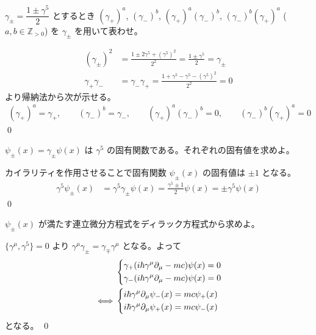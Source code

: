 \documentclass[uplatex,dvipdfmx,a4paper,11pt]{jlreq}
\makeatletter
\newcommand{\ZZ}{\mathbb{Z}}
\numberwithin{equation}{section}
\theoremstyle{definition}
\renewenvironment{proof}[1][\proofname]{\par
  \normalfont
  \topsep6\p@\@plus6\p@ \trivlist
  \item[\hskip\labelsep{\bfseries #1}\@addpunct{\bfseries}]\ignorespaces\quad\par
}{%
  \qed\endtrivlist\@endpefalse
}
\renewcommand\proofname{証明}
\makeatother
\begin{document}
\begin{problem}
$\gamma_\pm = \dfrac{1 \pm \gamma^5}{2}$ とするとき $(\gamma_+)^a$, $(\gamma_-)^b$, $(\gamma_+)^a(\gamma_-)^b$, $(\gamma_-)^b(\gamma_+)^a$ ($a, b\in\ZZ_{>0}$) を $\gamma_\pm$ を用いて表わせ。
\end{problem}
\begin{proof}
  \begin{align}
    (\gamma_\pm)^2   & = \frac{1 \pm 2\gamma^5 + (\gamma^5)^2}{2^2} = \frac{1 \pm \gamma^5}{2} = \gamma_\pm \\
    \gamma_+\gamma_- & = \gamma_-\gamma_+ = \frac{1 + \gamma^5 - \gamma^5 - (\gamma^5)^2}{2^2} = 0
  \end{align}
  より帰納法から次が示せる。
  \begin{align}
    (\gamma_+)^a = \gamma_+, \qquad (\gamma_-)^b = \gamma_-, \qquad (\gamma_+)^a(\gamma_-)^b = 0, \qquad (\gamma_-)^b(\gamma_+)^a = 0
  \end{align}
\end{proof}

\begin{problem}
$\psi_{\pm}(x) = \gamma_{\pm}\psi(x)$ は $\gamma^5$ の固有関数である。それぞれの固有値を求めよ。
\end{problem}
\begin{proof}
  カイラリティを作用させることで固有関数 $\psi_\pm(x)$ の固有値は $\pm 1$ となる。
  \begin{align}
    \gamma^5\psi_\pm(x) & = \gamma^5\gamma_\pm\psi(x) = \frac{\gamma^5 \pm 1}{2}\psi(x) = \pm\gamma^5\psi(x)
  \end{align}
\end{proof}

\begin{problem}
$\psi_\pm(x)$ が満たす連立微分方程式をディラック方程式から求めよ。
\end{problem}
\begin{proof}
  $\lbrace\gamma^\mu, \gamma^5\rbrace = 0$ より $\gamma^\mu\gamma_\pm = \gamma_\mp\gamma^\mu$ となる。よって
  \begin{align}
         & \begin{dcases}
             \gamma_+(i\hbar\gamma^\mu\partial_\mu - mc)\psi(x) = 0 \\
             \gamma_-(i\hbar\gamma^\mu\partial_\mu - mc)\psi(x) = 0 \\
           \end{dcases} \\
    \iff & \begin{dcases}
             i\hbar\gamma^\mu\partial_\mu\psi_-(x) = mc\psi_+(x) \\
             i\hbar\gamma^\mu\partial_\mu\psi_+(x) = mc\psi_-(x) \\
           \end{dcases}
  \end{align}
  となる。
\end{proof}
\end{document}
